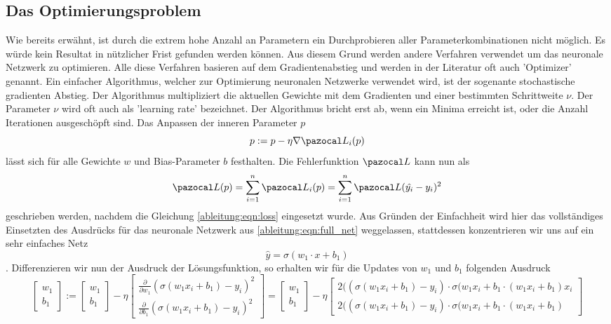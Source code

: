 \subsection{Das Optimierungsproblem}
Wie bereits erwähnt, ist durch die extrem hohe Anzahl an Parametern ein Durchprobieren aller Parameterkombinationen nicht möglich.
Es würde kein Resultat in nützlicher Frist gefunden werden können.
Aus diesem Grund werden andere Verfahren verwendet um das neuronale Netzwerk zu optimieren.
Alle diese Verfahren basieren auf dem Gradientenabstieg und werden in der Literatur oft auch 'Optimizer' genannt.
Ein einfacher Algorithmus, welcher zur Optimierung neuronalen Netzwerke verwendet wird, ist der sogenante stochastische gradienten Abstieg.
Der Algorithmus multipliziert die aktuellen Gewichte mit dem Gradienten und einer bestimmten Schrittweite $\nu$. 
Der Parameter $\nu$ wird oft auch als 'learning rate' bezeichnet.
Der Algorithmus bricht erst ab, wenn ein Minima erreicht ist, oder die Anzahl Iterationen ausgeschöpft sind.
Das Anpassen der inneren Parameter $p$ 
\begin{equation}
p:=p-\eta \nabla \Lb_{i}(p)
\end{equation}
lässt sich für alle Gewichte $w$ und Bias-Parameter $b$ festhalten.
Die Fehlerfunktion $\Lb$ kann nun als
\begin{equation}
\Lb(p)=\sum_{i=1}^{n}\Lb_{i}(p)=\sum_{i=1}^{n}\Lb(\hat{y_i}-y_i)^2
\end{equation}
geschrieben werden, nachdem die Gleichung \eqref{ableitung:eqn:loss} eingesetzt wurde. Aus Gründen der Einfachheit wird hier das vollständiges Einsetzten des Ausdrücks für das neuronale Netzwerk aus \eqref{ableitung:eqn:full_net} weggelassen, stattdessen konzentrieren wir uns auf ein sehr einfaches Netz
\begin{equation}
	\hat{y} = \sigma \left( w_1 \cdot x + b_1 \right)
\end{equation}
. Differenzieren wir nun der Ausdruck der Lösungsfunktion, so erhalten wir für die Updates von $w_1$ und $b_1$ folgenden Ausdruck
\begin{equation}
\begin{bmatrix}w_{1}\\b_{1}\end{bmatrix}:={\begin{bmatrix}w_{1}\\b_{1}\end{bmatrix}}-\eta {\begin{bmatrix}
{\frac {\partial }{\partial w_{1}}}(\sigma(w_{1}x_{i}+b_{1})-y_{i})^{2}\\
{\frac {\partial }{\partial b_{1}}}(\sigma(w_{1}x_{i}+b_{1})-y_{i})^{2}\end{bmatrix}}=
{\begin{bmatrix}w_{1}\\b_{1}\end{bmatrix}}-\eta {\begin{bmatrix}2((\sigma(w_{1}x_{i}+b_{1}) - y_i) \cdot \sigma(w_{1}x_{i}+b_{1} \cdot (w_{1}x_{i}+b_{1}) x_{i} \\2((\sigma(w_{1}x_{i}+b_{1}) - y_i) \cdot \sigma(w_{1}x_{i}+b_{1} \cdot (w_{1}x_{i}+b_{1}) \end{bmatrix}}
\end{equation}
